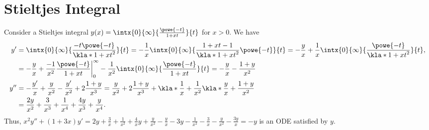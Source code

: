\documentclass[english, parskip=full]{scrartcl}
\title{\Title}
\author{\Author}
\date{\today}
\begin{document}
\maketitle  %

\section{Stieltjes Integral}
Consider a Stieltjes integral $y(x) = \intx{0}{\infty}{\frac{\powe{-t}}{1+xt}}{t}$ for $x>0$.
We have
\begin{align}
y' &= \intx{0}{\infty}{\frac{-t\powe{-t}}{\kla*{1+xt}^2}}{t} = -\frac{1}{x}\intx{0}{\infty}{\frac{1+xt-1}{\kla*{1+xt}^2}\powe{-t}}{t} = -\frac{y}{x} + \frac{1}{x}\intx{0}{\infty}{\frac{\powe{-t}}{\kla*{1+xt}^2}}{t},\\
&= -\frac{y}{x} + \frac{-1}{x^2} \frac{\powe{-t}}{1+xt} \bigg\vert_0^\infty - \frac{1}{x^2} \intx{0}{\infty}{\frac{\powe{-t}}{1+xt}}{t} = -\frac{y}{x} - \frac{1+y}{x^2}\\
y'' &= -\frac{y'}{x} + \frac{y}{x^2} - \frac{y'}{x^2} + 2\frac{1+y}{x^3} = \frac{y}{x^2} + 2\frac{1+y}{x^3} + \kla*{\frac{1}{x} + \frac{1}{x^2}} \kla*{\frac{y}{x} + \frac{1+y}{x^2}}\\
&= \frac{2y}{x^2} + \frac{3}{x^3} + \frac{1}{x^4} + \frac{4y}{x^3} + \frac{y}{x^4}.
\end{align}
Thus, $x^2y'' + (1+3x)y' = 2y+\frac{3}{x} + \frac{1}{x^2} + \frac{4}{x}y + \frac{y}{x^2} - \frac{y}{x} - 3y - \frac{1}{x^2} - \frac{3}{x} - \frac{y}{x^2} - \frac{3y}{x} = -y$ is an ODE satisfied by $y$.
\end{document}
